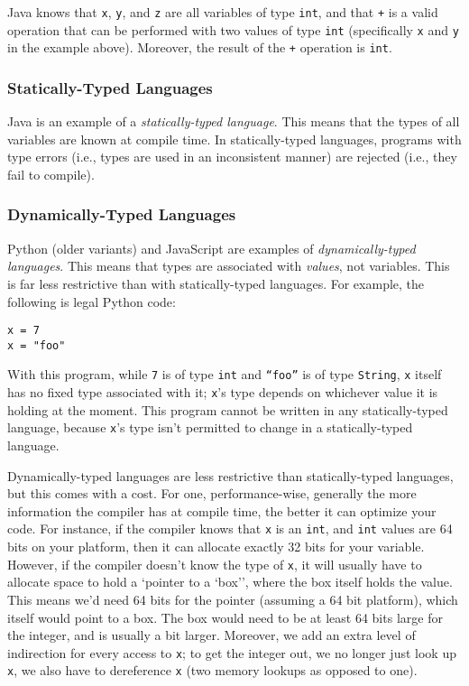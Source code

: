 Java knows that \texttt{x}, \texttt{y}, and \texttt{z} are all variables of type \texttt{int}, and that \texttt{+} is a valid operation that can be performed with two values of type \texttt{int} (specifically \texttt{x} and \texttt{y} in the example above).
Moreover, the result of the \texttt{+} operation is \texttt{int}.

\subsubsection{Statically-Typed Languages}
Java is an example of a \emph{statically-typed language}.
This means that the types of all variables are known at compile time.
In statically-typed languages, programs with type errors (i.e., types are used in an inconsistent manner) are rejected (i.e., they fail to compile).

\subsubsection{Dynamically-Typed Languages}
Python (older variants) and JavaScript are examples of \emph{dynamically-typed languages}.
This means that types are associated with \emph{values}, not variables.
This is far less restrictive than with statically-typed languages.
For example, the following is legal Python code:

\begin{verbatim}
x = 7
x = "foo"
\end{verbatim}

With this program, while \texttt{7} is of type \texttt{int} and \texttt{``foo''} is of type \texttt{String}, \texttt{x} itself has no fixed type associated with it; \texttt{x}'s type depends on whichever value it is holding at the moment.
This program cannot be written in any statically-typed language, because \texttt{x}'s type isn't permitted to change in a statically-typed language.

Dynamically-typed languages are less restrictive than statically-typed languages, but this comes with a cost.
For one, performance-wise, generally the more information the compiler has at compile time, the better it can optimize your code.
For instance, if the compiler knows that \texttt{x} is an \texttt{int}, and \texttt{int} values are 64 bits on your platform, then it can allocate exactly 32 bits for your variable.
However, if the compiler doesn't know the type of \texttt{x}, it will usually have to allocate space to hold a `pointer to a `box'', where the box itself holds the value.
This means we'd need 64 bits for the pointer (assuming a 64 bit platform), which itself would point to a box.
The box would need to be at least 64 bits large for the integer, and is usually a bit larger.
Moreover, we add an extra level of indirection for every access to \texttt{x}; to get the integer out, we no longer just look up \texttt{x}, we also have to dereference \texttt{x} (two memory lookups as opposed to one).

